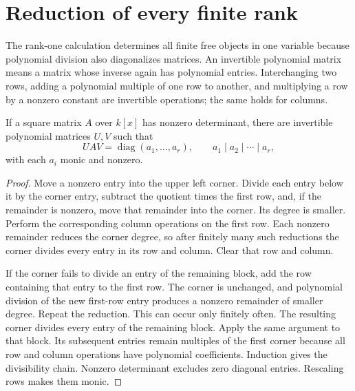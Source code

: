 \section{Reduction of every finite rank}
\label{sec:pb-every-rank}

The rank-one calculation determines all finite free objects in one
variable because polynomial division also diagonalizes matrices.
An invertible polynomial matrix means a matrix whose inverse again
has polynomial entries. Interchanging two rows, adding a polynomial
multiple of one row to another, and multiplying a row by a nonzero
constant are invertible operations; the same holds for columns.

\begin{lemma}
\label{lem:pb-smith}
If a square matrix \(A\) over \(k[x]\) has nonzero determinant, there
are invertible polynomial matrices \(U,V\) such that
\[
 UAV=\operatorname{diag}(a_1,\ldots,a_r),\qquad
 a_1\mid a_2\mid\cdots\mid a_r,
\]
with each \(a_i\) monic and nonzero.
\end{lemma}
\begin{proof}
Move a nonzero entry into the upper left corner. Divide each entry
below it by the corner entry, subtract the quotient times the first
row, and, if the remainder is nonzero, move that remainder into the
corner. Its degree is smaller. Perform the corresponding column
operations on the first row. Each nonzero remainder reduces the
corner degree, so after finitely many such reductions the corner
divides every entry in its row and column. Clear that row and column.

If the corner fails to divide an entry of the remaining block, add
the row containing that entry to the first row. The corner is
unchanged, and polynomial division of the new first-row entry
produces a nonzero remainder of smaller degree. Repeat the reduction.
This can occur only finitely often. The resulting corner divides
every entry of the remaining block. Apply the same argument to that
block. Its subsequent entries remain multiples of the first corner
because all row and column operations have polynomial coefficients.
Induction gives the divisibility chain. Nonzero determinant excludes
zero diagonal entries. Rescaling rows makes them monic.
\end{proof}

